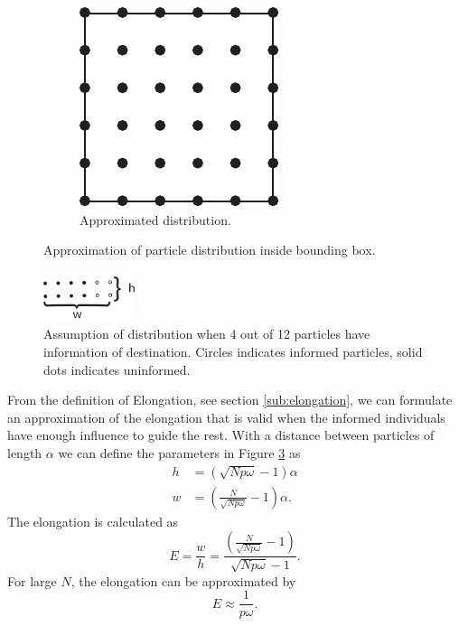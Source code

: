\begin{figure}[H]
\begin{subfigure}[b]{\figwidth}
		\includegraphics[width=\textwidth]{img/Square.pdf}
		\caption{Approximated distribution.}
		\label{fig:distr_approx}
	\end{subfigure}
	\caption{Approximation of particle distribution inside bounding box.}
	\label{fig:distr}
\end{figure}

\begin{figure}[H]
	\centering
	\includegraphics[width=0.24\textwidth]{img/heightwidth.pdf}
	\caption{Assumption of distribution when 4 out of 12 particles have information of destination. Circles indicates informed particles, solid dots indicates uninformed.}
	\label{fig:distr_direction}
\end{figure}
From the definition of Elongation, see section \ref{sub:elongation}, we can formulate an approximation of the elongation that is valid when the informed individuals have enough influence to guide the rest. With a distance between particles of length $\alpha$ we can define the parameters in Figure \ref{fig:distr_direction} as
\begin{align}
	h &= (\sqrt{Np\omega}-1)\alpha \\
	w & = (\frac{N}{\sqrt{Np\omega}} -1) \alpha.
\end{align}
The elongation is calculated as 
\begin{equation}
	E = \frac{w}{h} = \frac{(\frac{N}{\sqrt{Np\omega}} -1)}{\sqrt{Np\omega}-1}.
\end{equation}
For large $N$, the elongation can be approximated by
\begin{equation}
	E \approx \frac{1}{p\omega}.
\end{equation}